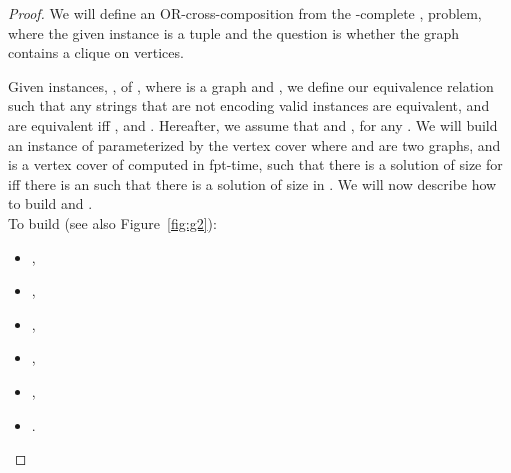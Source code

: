 \begin{proof}

We will define an OR-cross-composition from the -complete \clique, problem, where the given instance is a tuple  and the question is whether the graph  contains a clique on  vertices. 

Given  instances, , of \clique, where  is a graph and , we define our equivalence relation  such that any strings that are not encoding valid instances are equivalent, and  are equivalent iff , and . Hereafter, we assume that  and , for any . We will build an instance of \mcis parameterized by the vertex cover  where  and  are two graphs,  and  is a vertex cover of  computed in fpt-time, such that there is a solution of size  for \mcis iff there is an  such that there is a solution of size  in . We will now describe how to build  and .\\

To build  (see also Figure~\ref{fig:g2}):

\begin{itemize}
\item       ,
\item ,
\item   ,
\item   ,
\item   ,
\item .
\end{itemize}

\begin{figure}[ht!]
\centering
{}
\end{figure}
\end{proof}
